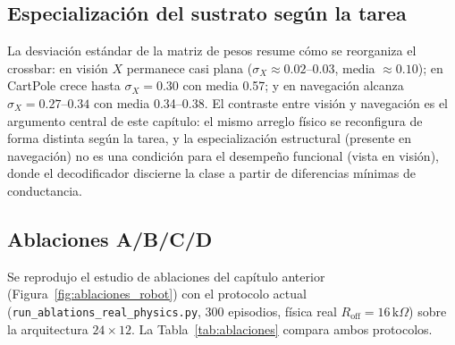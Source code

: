 \subsection{Especialización del sustrato según la tarea}

La desviación estándar de la matriz de pesos resume cómo se 
reorganiza el crossbar: en visión $X$ permanece casi plana 
($\sigma_X \approx 0.02$--$0.03$, media $\approx 0.10$); en 
CartPole crece hasta $\sigma_X = 0.30$ con media 0.57; y en 
navegación alcanza $\sigma_X = 0.27$--$0.34$ con media 0.34--0.38. 
El contraste entre visión y navegación es el argumento central de 
este capítulo: el mismo arreglo físico se reconfigura de forma 
distinta según la tarea, y la especialización estructural (presente 
en navegación) no es una condición para el desempeño funcional 
(vista en visión), donde el decodificador discierne la clase a 
partir de diferencias mínimas de conductancia.

\subsection{Ablaciones A/B/C/D}
\label{sec:ablaciones_34}

Se reprodujo el estudio de ablaciones del capítulo anterior
(Figura~\ref{fig:ablaciones_robot}) con el protocolo actual
(\texttt{run\_ablations\_real\_physics.py}, 300 episodios, física real
$R_{\text{off}} = 16\,\text{k}\Omega$) sobre la arquitectura $24 \times 12$.
La Tabla~\ref{tab:ablaciones} compara ambos protocolos.

